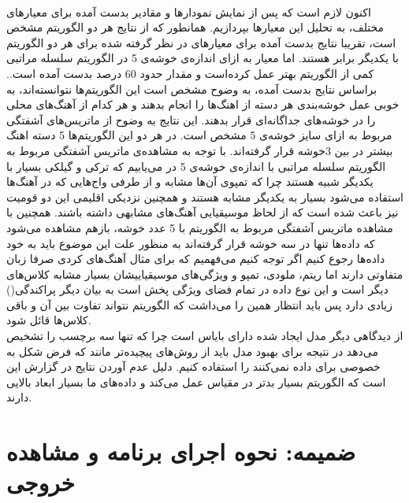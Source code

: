 \documentclass[10pt,onecolumn,a4paper]{article}
\begin{document}
\\
اکنون لازم است که پس از نمایش نمودارها و مقادیر بدست آمده برای معیارهای مختلف، به تحلیل این معیارها بپردازیم. همانطور که از نتایج هر دو الگوریتم مشخص است، تقریبا نتایج بدست آمده برای معیارهای در نظر گرفته شده برای هر دو الگوریتم با یکدیگر برابر هستند. اما معیار   به ازای اندازه‌ی خوشه‌ی 5 در الگوریتم سلسله مراتبی کمی از الگوریتم   بهتر عمل کرده‌است و مقدار حدود 60 درصد بدست آمده است..   براساس نتایج بدست آمده، به وضوح مشخص است این الگوریتم‌ها نتوانسته‌اند، به خوبی عمل خوشه‌بندی هر دسته‌ از اهنگ‌ها را انجام بدهند و هر کدام از آهنگ‌های محلی را در خوشه‌های جداگانه‌ای قرار بدهند. این نتایج به وضوح از ماتریس‌های آشفتگی مربوط به ازای سایز خوشه‌ی 5 مشخص است. در هر دو این الگوریتم‌ها 5 دسته اهنگ بیشتر در بین 3خوشه‌ قرار گرفته‌‌اند.
با توجه  به مشاهده‌ی ماتریس آشفتگی مربوط به الگوریتم سلسله مراتبی با اندازه‌ی خوشه‌ی 5 در می‌یابیم که ترکی و گیلکی بسیار با یکدیگر شبیه هستند چرا که تمپوی آن‌ها مشابه و از طرفی واج‌هایی که در آهنگ‌ها استفاده می‌شود بسیار به یکدیگر مشابه هستند و همچنین نزدیکی اقلیمی این دو قومیت نیز باعث شده است که از لحاظ موسیقیایی آهنگ‌های مشابهی داشته باشند.  
همچنین با مشاهده ماتریس آشفتگی مربوط به الگوریتم   با 5 عدد خوشه، بازهم مشاهده می‌شود که داده‌ها تنها در سه خوشه قرار گرفته‌اند به منظور علت این موضوع باید به خود داده‌ها رجوع کنیم اگر توجه کنیم می‌فهمیم که برای مثال آهنگ‌های کردی صرفا زبان متفاوتی دارند اما ریتم، ملودی، تمپو و ویژگی‌های موسیقیاییشان بسیار مشابه کلاس‌های دیگر است و این نوع داده در تمام فضای ویژگی پخش است به بیان دیگر پراکندگی() زیادی دارد پس باید انتظار همین را می‌داشت که الگوریتم نتواند تفاوت بین آن و باقی کلاس‌ها قائل شود. 
\\
از دیدگاهی دیگر مدل ایجاد شده دارای بایاس است چرا که تنها سه برچسب را تشخیص می‌دهد در نتیجه برای بهبود مدل باید از روش‌های پیچیده‌تر مانند  که فرض شکل به خصوصی برای داده نمی‌کنند را استفاده کنیم. دلیل عدم آوردن نتایج  در گزارش این است که الگوریتم  بسیار بدتر در مقیاس عمل می‌کند و داده‌های ما بسیار ابعاد بالایی دارند.
\\
\pagebreak

\section{ضمیمه: نحوه اجرای برنامه و مشاهده خروجی}
\end{document}
